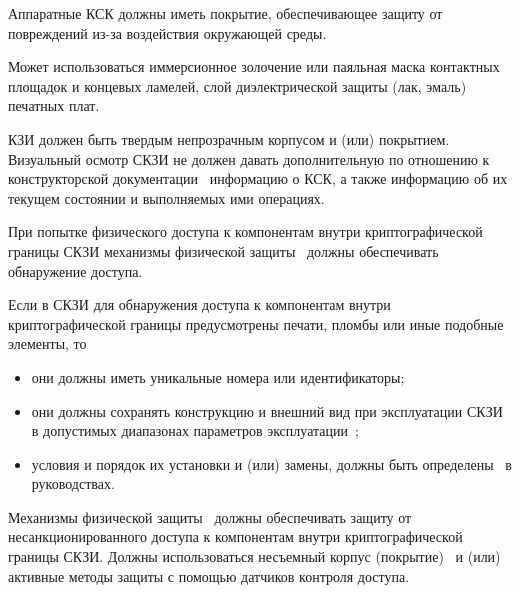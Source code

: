 \label{R.PS.Passivation} %
Аппаратные КСК должны иметь покрытие, обеспечивающее защиту от 
повреждений из-за воздействия окружающей среды. 

\begin{note*}
Может использоваться иммерсионное золочение или паяльная маска 
контактных площадок и концевых ламелей, слой диэлектрической защиты 
(лак, эмаль) печатных плат.
\end{note*}
\fi


\label{R.PS.Coating} %
КЗИ должен быть 
твердым непрозрачным корпусом и (или) покрытием.
%
Визуальный осмотр СКЗИ не должен давать дополнительную по отношению 
к конструкторской документации~ информацию о КСК, 
а также информацию об их текущем состоянии и выполняемых ими операциях.


\label{R.PS.PassiveDetection} %
При попытке физического доступа к компонентам внутри 
криптографической границы СКЗИ механизмы физической защиты~ 
должны обеспечивать обнаружение доступа. 

\label{R.PS.PassiveDetectionId} %
Если в СКЗИ для обнаружения доступа к компонентам внутри криптографической 
границы предусмотрены печати, пломбы или иные подобные элементы, то 
\begin{itemize}
\item
они должны иметь уникальные номера или идентификаторы;
\item
они должны сохранять конструкцию и внешний вид при эксплуатации СКЗИ в допустимых 
диапазонах параметров эксплуатации~;
\item
условия и порядок их установки и (или) замены, 
должны быть определены~ в руководствах.
\end{itemize}


\label{R.PS.ActiveDetectionSensor} %
Механизмы физической защиты~ должны обеспечивать 
защиту от несанкционированного доступа к компонентам внутри 
криптографической границы СКЗИ. 
%
Должны использоваться несъемный корпус (покрытие)~ 
и (или) активные методы защиты с помощью датчиков контроля доступа.

